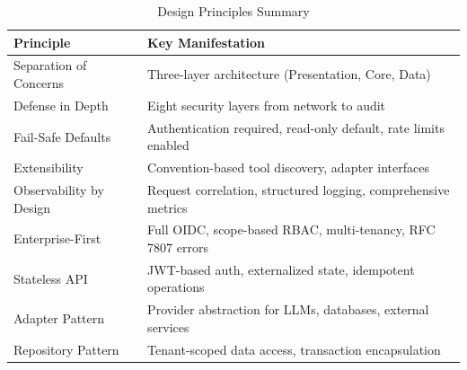 \begin{table}[htbp]
\centering
\caption{Design Principles Summary}
\label{tab:principle-summary}
\small
\begin{tabular}{|l|p{10cm}|}
\hline
\textbf{Principle} & \textbf{Key Manifestation} \\
\hline
Separation of Concerns & Three-layer architecture (Presentation, Core, Data) \\
\hline
Defense in Depth & Eight security layers from network to audit \\
\hline
Fail-Safe Defaults & Authentication required, read-only default, rate limits enabled \\
\hline
Extensibility & Convention-based tool discovery, adapter interfaces \\
\hline
Observability by Design & Request correlation, structured logging, comprehensive metrics \\
\hline
Enterprise-First & Full OIDC, scope-based RBAC, multi-tenancy, RFC 7807 errors \\
\hline
Stateless API & JWT-based auth, externalized state, idempotent operations \\
\hline
Adapter Pattern & Provider abstraction for LLMs, databases, external services \\
\hline
Repository Pattern & Tenant-scoped data access, transaction encapsulation \\
\hline
\end{tabular}
\end{table}
